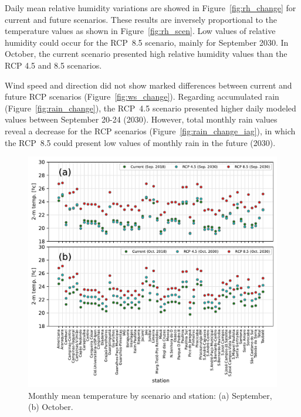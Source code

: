 Daily mean relative humidity variations are showed in Figure~\ref{fig:rh_change} for current and future scenarios.
These results are inversely proportional to the temperature values as shown in Figure~\ref{fig:rh_scen}.
Low values of relative humidity could occur for the RCP~8.5 scenario, mainly for September 2030.
In October, the current scenario presented high relative humidity values than the RCP 4.5 and 8.5 scenarios.

Wind speed and direction did not show marked differences between current and future RCP scenarios (Figure~\ref{fig:ws_change}).
Regarding accumulated rain (Figure~\ref{fig:rain_change}), the RCP~4.5 scenario presented higher daily modeled values between September 20-24 (2030).
However, total monthly rain values reveal a decrease for the RCP scenarios (Figure~\ref{fig:rain_change_iag}), in which the RCP~8.5 could present low values of monthly rain in the future (2030).

 \begin{figure}[hbt]
  \includegraphics[width=1\textwidth]{fig/temp_sep_oct.pdf}
  \caption{Monthly mean temperature by scenario and station: (a) September, (b) October.}
  \label{fig:temp_scen}
\end{figure}

